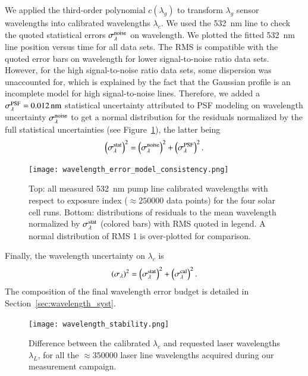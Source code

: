 We applied the third-order polynomial $c(\lambda_g)$ to transform $\lambda_g$ sensor wavelengths into calibrated wavelengths $\lambda_c$. We used the \SI{532}{\nm} line to check the quoted statistical errors $\sigma_\lambda^{\rm noise}$ on wavelength. We plotted the fitted \SI{532}{\nm} line position versus time for all data sets. The RMS is compatible with the quoted error bars on wavelength for lower signal-to-noise ratio data sets. However, for the high signal-to-noise ratio data sets, some dispersion was unaccounted for, which is explained by the fact that the Gaussian profile is an incomplete model for high signal-to-noise lines. Therefore, we added a $\sigma_\lambda^{\rm PSF}=\SI{0.012}{\nm}$ statistical uncertainty attributed to PSF modeling on wavelength uncertainty $\sigma_{\lambda}^{\rm noise}$ to get a normal distribution for the residuals normalized by the full statistical uncertainties (see Figure~\ref{fig:wavelength_error_model_consistency}), the latter being
\begin{equation}
    \left(\sigma_{\lambda}^{\rm stat}\right)^2 =  \left(\sigma_{\lambda}^{\rm noise}\right)^2 +  \left(\sigma_{\lambda}^{\rm PSF}\right)^2.
\end{equation}

\begin{figure}[!h]
\centering
\texttt{[image: wavelength\_error\_model\_consistency.png]}
\caption{Top: all measured \SI{532}{\nm} pump line calibrated wavelengths with respect to exposure index ($\approx\num{250000}$ data points) for the four solar cell runs. Bottom: distributions of residuals to the mean wavelength normalized by $\sigma_{\lambda}^{\rm stat}$ (colored bars) with RMS quoted in legend. A normal distribution of RMS 1 is over-plotted for comparison.}\label{fig:wavelength_error_model_consistency}
\end{figure}

Finally, the wavelength uncertainty on $\lambda_c$ is
\begin{equation}
  \left(\sigma_{\lambda}\right)^2 =  \left(\sigma_{\lambda}^{\rm stat}\right)^2 +  \left(\sigma_{\lambda}^{\rm cal}\right)^2.   
\end{equation}
The composition of the final wavelength error budget is detailed in Section~\ref{sec:wavelength_syst}.


\begin{figure}[!h]
\centering
\texttt{[image: wavelength\_stability.png]}
\caption{Difference between the calibrated $\lambda_c$ and requested laser wavelengths $\lambda_L$, for all the $\approx \num{350000}$ laser line wavelengths acquired during our measurement campaign.}\label{fig:wavelength_stability}
\end{figure}


